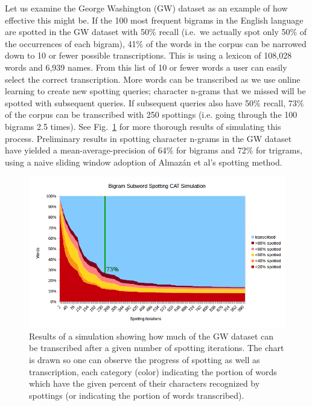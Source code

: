 \documentclass[conference]{IEEEtran}
\begin{document}
Let us examine the George Washington (GW) dataset\cite{GW} as an example of how effective this might be. If the 100 most frequent bigrams in the English language are spotted in the GW dataset with 50\% recall (i.e.~we actually spot only 50\% of the occurrences of each bigram), 41\% of the words in the corpus can be narrowed down to 10 or fewer possible transcriptions. This is using a lexicon of 108,028 words and 6,939 names. From this list of 10 or fewer words a user can easily select the correct transcription. More words can be transcribed as we use online learning to create new spotting queries; character n-grams that we missed will be spotted with subsequent queries. If subsequent queries also have 50\% recall, 73\% of the corpus can be transcribed with 250 spottings (i.e. going through the 100 bigrams 2.5 times). See Fig.~\ref{fig:fullSim} for more thorough results of simulating this process. Preliminary results in spotting character n-grams in the GW dataset have yielded a mean-average-precision of 64\% for bigrams and 72\% for trigrams, using a naive sliding window adoption of Almaz\'{a}n et al's\cite{Almazan2014} spotting method.


\begin{figure}
    \centering
    \includegraphics[width=.49\textwidth]{simulationGraph_big_line}
    \caption{Results of a simulation showing how much of the GW dataset can be transcribed after a given number of spotting iterations. The chart is drawn so one can observe the progress of spotting as well as transcription, each category (color) indicating the portion of words which have the given percent of their characters recognized by spottings (or indicating the portion of words transcribed).}
    \label{fig:fullSim}
\end{figure}
\end{document}
